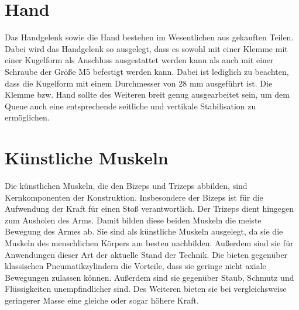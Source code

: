 	\section{Hand}
		Das Handgelenk sowie die Hand bestehen im Wesentlichen aus gekauften Teilen.
		Dabei wird das Handgelenk so ausgelegt, dass es sowohl mit einer Klemme mit einer Kugelform als Anschluss ausgestattet werden kann als auch mit einer Schraube der Größe M5 befestigt werden kann.
		Dabei ist lediglich zu beachten, dass die Kugelform mit einem Durchmesser von 28 mm ausgeführt ist.
		Die Klemme bzw. Hand sollte des Weiteren breit genug ausgearbeitet sein, um dem Queue auch eine entsprechende seitliche und vertikale Stabilisation zu ermöglichen.
	
	\section{Künstliche Muskeln}
		Die künstlichen Muskeln, die den Bizeps und Trizeps abbilden, sind Kernkomponenten der Konstruktion. 
		Insbesondere der Bizeps ist für die Aufwendung der Kraft für einen Stoß verantwortlich. 
		Der Trizeps dient hingegen zum Ausholen des Arms.
		Damit bilden diese beiden Muskeln die meiste Bewegung des Armes ab.
		Sie sind als künstliche Muskeln ausgelegt, da sie die Muskeln des menschlichen Körpers am besten nachbilden. 
		Außerdem sind sie für Anwendungen dieser Art der aktuelle Stand der Technik. 
		Die bieten gegenüber klassischen Pneumatikzylindern die Vorteile, dass sie geringe nicht axiale Bewegungen zulassen können. 
		Außerdem sind sie gegenüber Staub, Schmutz und Flüssigkeiten unempfindlicher sind. 
		Des Weiteren bieten sie bei vergleichsweise geringerer Masse eine gleiche oder sogar höhere Kraft.  